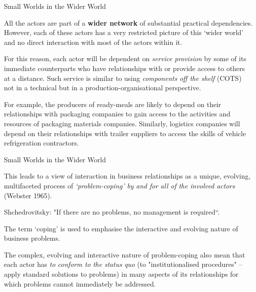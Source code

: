 \documentclass{beamer}
\begin{document}
\begin{frame}{Small Worlds in the Wider World}

All the actors are part of a \textbf{wider network} of substantial practical
dependencies.  However, each of these actors has a very restricted picture of
this ‘wider world’ and no direct interaction with most of the actors within
it.

For this reason, each actor will be dependent on \emph{service provision} by
some of its immediate counterparts who have relationships with or provide
access to others at a distance. Such service is similar to using
\emph{components off the shelf} (COTS) not in a technical but in a
production-organisational perspective.

For example, the producers of ready-meals are likely to depend on their
relationships with packaging companies to gain access to the activities and
resources of packaging materials companies. Similarly, logistics companies
will depend on their relationships with trailer suppliers to access the skills
of vehicle refrigeration contractors.

\end{frame}

\begin{frame}{Small Worlds in the Wider World}

This leads to a view of interaction in business relationships as a unique,
evolving, multifaceted process of \emph{‘problem-coping’ by and for all of the
  involved actors} (Webster 1965).

Shchedrovitsky: "If there are no problems, no management is required“.

The term ‘coping’ is used to emphasise the interactive and evolving nature of
business problems.

The complex, evolving and interactive nature of problem-coping also mean that
each actor has \emph{to conform to the status quo} (to "institutionalised
procedures" -- apply standard solutions to problems) in many aspects of its
relationships for which problems cannot immediately be addressed.

\end{frame}
\end{document}
